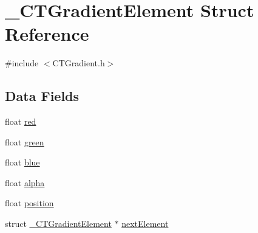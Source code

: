 \hypertarget{struct___c_t_gradient_element}{\section{\-\_\-\-C\-T\-Gradient\-Element Struct Reference}
\label{struct___c_t_gradient_element}
}


{\ttfamily \#include $<$C\-T\-Gradient.\-h$>$}

\subsection*{Data Fields}
\begin{DoxyCompactItemize}
\item 
float \hyperlink{struct___c_t_gradient_element_acddf4f34ba92c602d4205ba50e98d603}{red}
\item 
float \hyperlink{struct___c_t_gradient_element_af8d69af46156237d69b44a880e4f486e}{green}
\item 
float \hyperlink{struct___c_t_gradient_element_a322e0de27f54901aa172ae487dba2914}{blue}
\item 
float \hyperlink{struct___c_t_gradient_element_ab1551d8043c2aa4410fb7dbb1fe3be7b}{alpha}
\item 
float \hyperlink{struct___c_t_gradient_element_a76777b356ab2a080225682528119c4fe}{position}
\item 
struct \hyperlink{struct___c_t_gradient_element}{\-\_\-\-C\-T\-Gradient\-Element} $\ast$ \hyperlink{struct___c_t_gradient_element_a4a65c2e7b23872e9638ec4d22fd502d6}{next\-Element}
\end{DoxyCompactItemize}



